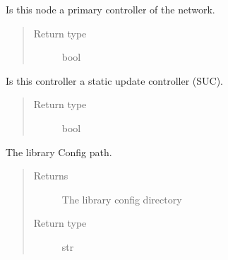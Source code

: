 \documentclass[letterpaper,10pt,english]{sphinxmanual}
\begin{document}
\begin{fulllineitems}
\begin{fulllineitems}
\begin{quote}
\begin{description}
\end{description}\end{quote}

\end{fulllineitems}


\begin{fulllineitems}
\label{controller:openzwave.controller.ZWaveController.is_primary_controller}
Is this node a primary controller of the network.
\begin{quote}\begin{description}
\item[{Return type}] \leavevmode
bool

\end{description}\end{quote}

\end{fulllineitems}


\begin{fulllineitems}
\label{controller:openzwave.controller.ZWaveController.is_static_update_controller}
Is this controller a static update controller (SUC).
\begin{quote}\begin{description}
\item[{Return type}] \leavevmode
bool

\end{description}\end{quote}

\end{fulllineitems}


\begin{fulllineitems}
\label{controller:openzwave.controller.ZWaveController.library_config_path}
The library Config path.
\begin{quote}\begin{description}
\item[{Returns}] \leavevmode
The library config directory

\item[{Return type}] \leavevmode
str


\end{description}
\end{quote}
\end{fulllineitems}
\end{fulllineitems}
\end{document}

